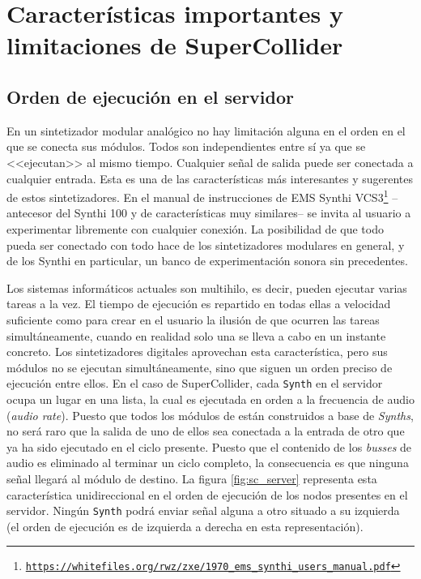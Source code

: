\section[Características de SuperCollider]{Características importantes y limitaciones de SuperCollider}
\label{sec:sc_features}

\subsection{Orden de ejecución en el servidor}
En un sintetizador modular analógico no hay limitación alguna en el orden en el que se conecta sus módulos. Todos son independientes entre sí ya que se <<ejecutan>> al mismo tiempo. Cualquier señal de salida puede ser conectada a cualquier entrada. Esta es una de las características más interesantes y sugerentes de estos sintetizadores. En el manual de instrucciones de EMS Synthi VCS3\footnote{\href{https://whitefiles.org/rwz/zxe/1970\_ems\_synthi\_users\_manual.pdf}{\texttt{https://whitefiles.org/rwz/zxe/1970\_ems\_synthi\_users\_manual.pdf}}} --antecesor del Synthi 100 y de características muy similares-- se invita al usuario a experimentar libremente con cualquier conexión. La posibilidad de que todo pueda ser conectado con todo hace de los sintetizadores modulares en general, y de los Synthi en particular, un banco de experimentación sonora sin precedentes.

Los sistemas informáticos actuales son multihilo, es decir, pueden ejecutar varias tareas a la vez. El tiempo de ejecución es repartido en todas ellas a velocidad suficiente como para crear en el usuario la ilusión de que ocurren las tareas simultáneamente, cuando en realidad solo una se lleva a cabo en un instante concreto. Los sintetizadores digitales aprovechan esta característica, pero sus módulos no se ejecutan simultáneamente, sino que siguen un orden preciso de ejecución entre ellos. En el caso de SuperCollider, cada \texttt{Synth} en el servidor ocupa un lugar en una lista, la cual es ejecutada en orden a la frecuencia de audio (\textit{audio rate}). Puesto que todos los módulos de \appName están construidos a base de \textit{Synths}, no será raro que la salida de uno de ellos sea conectada a la entrada de otro que ya ha sido ejecutado en el ciclo presente. Puesto que el contenido de los \textit{busses} de audio es eliminado al terminar un ciclo completo, la consecuencia es que ninguna señal llegará al módulo de destino. La figura \ref{fig:sc_server} representa esta característica unidireccional en el orden de ejecución de los nodos presentes en el servidor. Ningún \texttt{Synth} podrá enviar señal alguna a otro situado a su izquierda (el orden de ejecución es de izquierda a derecha en esta representación).

